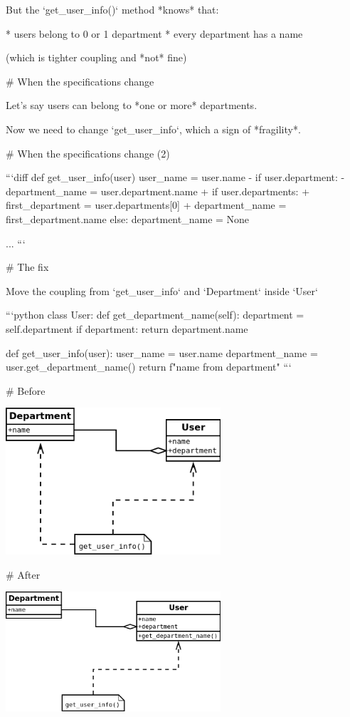 \vfill

But the `get_user_info()` method *knows* that:

* users belong to 0 or 1 department
* every department has a name

(which is tighter coupling and *not* fine)


# When the specifications change

Let's say users can belong to *one or more* departments.

Now we need to change `get_user_info`, which a sign of *fragility*.

# When the specifications change (2)

```diff
def get_user_info(user)
    user_name = user.name
-    if user.department:
-       department_name = user.department.name
+    if user.departments:
+       first_department = user.departments[0]
+       department_name = first_department.name
    else:
        department_name = None

    ...
```


# The fix

Move the coupling from `get_user_info` and `Department` inside `User`

```python
class User:
    def get_department_name(self):
        department = self.department
        if department:
            return department.name

def get_user_info(user):
    user_name = user.name
    department_name = user.get_department_name()
    return f"{name} from {department}"
```

# Before

\includegraphics[width=8cm]{demeter-1.png}

# After

\includegraphics[width=8cm]{demeter-2.png}


